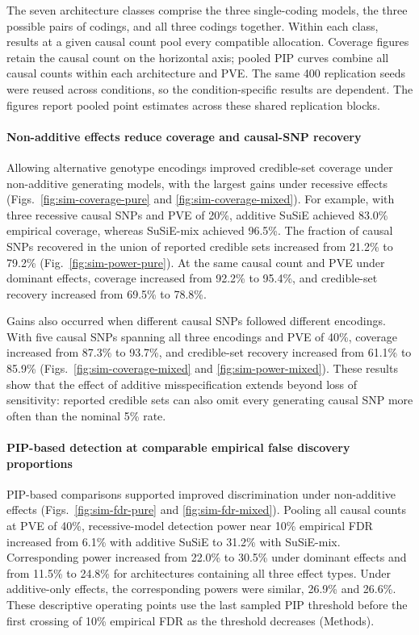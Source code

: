 \documentclass[12pt]{article}
\begin{document}
The seven architecture classes comprise the three single-coding models,
the three possible pairs of codings, and all three codings together.
Within each class, results at a given causal count pool every compatible
allocation. Coverage figures retain the causal count on the horizontal
axis; pooled PIP curves combine all causal counts within each
architecture and PVE. The same 400 replication seeds were reused across
conditions, so the condition-specific results are dependent. The
figures report pooled point estimates across these shared replication
blocks.

\paragraph{Non-additive effects reduce coverage and causal-SNP recovery}

Allowing alternative genotype encodings improved credible-set coverage
under non-additive generating models, with the largest gains under
recessive effects (Figs.~\ref{fig:sim-coverage-pure} and
\ref{fig:sim-coverage-mixed}). For example, with three recessive causal
SNPs and PVE of 20\%, additive SuSiE achieved 83.0\% empirical coverage,
whereas SuSiE-mix achieved 96.5\%. The fraction of causal SNPs recovered
in the union of reported credible sets increased from 21.2\% to 79.2\%
(Fig.~\ref{fig:sim-power-pure}). At the same causal count and PVE under
dominant effects, coverage increased from 92.2\% to 95.4\%, and
credible-set recovery increased from 69.5\% to 78.8\%.

Gains also occurred when different causal SNPs followed different
encodings. With five causal SNPs spanning all three encodings and PVE
of 40\%, coverage increased from 87.3\% to 93.7\%, and credible-set
recovery increased from 61.1\% to 85.9\%
(Figs.~\ref{fig:sim-coverage-mixed} and \ref{fig:sim-power-mixed}).
These results show that the effect of additive misspecification extends
beyond loss of sensitivity: reported credible sets can also omit every
generating causal SNP more often than the nominal 5\% rate.

\paragraph{PIP-based detection at comparable empirical false discovery proportions}

PIP-based comparisons supported improved discrimination under
non-additive effects (Figs.~\ref{fig:sim-fdr-pure} and
\ref{fig:sim-fdr-mixed}). Pooling all causal counts at PVE of 40\%,
recessive-model detection power near 10\% empirical FDR increased from
6.1\% with additive SuSiE to 31.2\% with SuSiE-mix. Corresponding power
increased from 22.0\% to 30.5\% under dominant effects and from 11.5\%
to 24.8\% for architectures containing all three effect types.
Under additive-only effects, the corresponding powers were similar,
26.9\% and 26.6\%. These descriptive operating points use the last
sampled PIP threshold before the first crossing of 10\% empirical FDR
as the threshold decreases (Methods).
\end{document}
